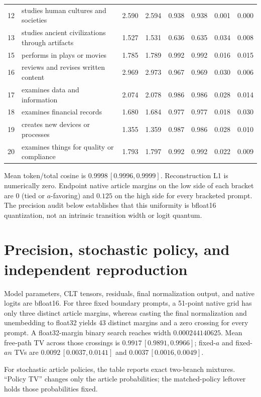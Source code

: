 \begin{table}[h]
\begin{tabular}{rlcccccc}
12 & studies human cultures and societies & 2.590 & 2.594 & 0.938 & 0.938 & 0.001 & 0.000 \\
13 & studies ancient civilizations through artifacts & 1.527 & 1.531 & 0.636 & 0.635 & 0.034 & 0.008 \\
15 & performs in plays or movies & 1.785 & 1.789 & 0.992 & 0.992 & 0.016 & 0.015 \\
16 & reviews and revises written content & 2.969 & 2.973 & 0.967 & 0.969 & 0.030 & 0.006 \\
17 & examines data and information & 2.074 & 2.078 & 0.986 & 0.986 & 0.028 & 0.014 \\
18 & examines financial records & 1.680 & 1.684 & 0.977 & 0.977 & 0.018 & 0.030 \\
19 & creates new devices or processes & 1.355 & 1.359 & 0.987 & 0.986 & 0.028 & 0.010 \\
20 & examines things for quality or compliance & 1.793 & 1.797 & 0.992 & 0.992 & 0.022 & 0.009 \\
\bottomrule
\end{tabular}
\end{table}

Mean token/total cosine is \(0.9998\,[0.9996,0.9999]\). Reconstruction L1
is numerically zero. Endpoint native article margins on the low side of
each bracket are \(0\) (tied or \(a\)-favoring) and \(0.125\) on the high
side for every bracketed prompt. The precision audit below establishes
that this uniformity is bfloat16 quantization, not an intrinsic transition
width or logit quantum.

\section{Precision, stochastic policy, and independent reproduction}
\label{app:precision-policy}

Model parameters, CLT tensors, residuals, final normalization output, and
native logits are bfloat16. For three fixed boundary prompts, a 51-point
native grid has only three distinct article margins, whereas casting the
final normalization and unembedding to float32 yields 43 distinct margins
and a zero crossing for every prompt. A float32-margin binary search reaches
width \(0.000244140625\). Mean free-path TV across those crossings is
\(0.9917\,[0.9891,0.9966]\); fixed-\(a\) and fixed-\(an\) TVs are
\(0.0092\,[0.0037,0.0141]\) and \(0.0037\,[0.0016,0.0049]\).

For stochastic article policies, the table reports exact two-branch
mixtures. ``Policy TV'' changes only the article probabilities; the
matched-policy leftover holds those probabilities fixed.


